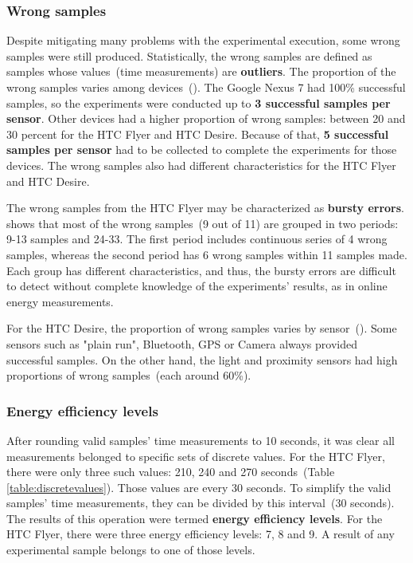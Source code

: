 \subsubsection{Wrong samples}
\hspace{10pt} Despite mitigating many problems with the experimental execution, some wrong samples were still produced. Statistically, the wrong samples are defined as samples whose values\ (time measurements) are \textbf{outliers}. The proportion of the wrong samples varies among devices\ (). The Google Nexus 7 had 100\% successful samples, so the experiments were conducted up to \textbf{3 successful samples per sensor}. Other devices had a higher proportion of wrong samples: between 20 and 30 percent for the HTC Flyer and HTC Desire. Because of that, \textbf{5 successful samples per sensor} had to be collected to complete the experiments for those devices. The wrong samples also had different characteristics for the HTC Flyer and HTC Desire. 

	
The wrong samples from the HTC Flyer may be characterized as \textbf{bursty errors}.  shows that most of the wrong samples\ (9 out of 11) are grouped in two periods: 9-13 samples and 24-33. The first period includes continuous series of 4 wrong samples, whereas the second period has 6 wrong samples within 11 samples made. Each group has different characteristics, and thus, the bursty errors are difficult to detect without complete knowledge of the experiments' results, as in online energy measurements.


For the HTC Desire, the proportion of wrong samples varies by sensor\ (). Some sensors such as "plain run", Bluetooth, GPS or Camera always provided successful samples. On the other hand, the light and proximity sensors had high proportions of wrong samples\ (each around 60\%). 



\subsubsection{Energy efficiency levels}
\label{s:implementation:levels}
\hspace{10pt} After rounding valid samples' time measurements to 10 seconds, it was clear all measurements belonged to specific sets of discrete values. For the HTC Flyer, there were only three such values: 210, 240 and 270 seconds\ (Table \ref{table:discretevalues}). Those values are every 30 seconds. To simplify the valid samples' time measurements, they can be divided by this interval\ (30 seconds). The results of this operation were termed \textbf{energy efficiency levels}. For the HTC Flyer, there were three energy efficiency levels: 7, 8 and 9. A result of any experimental sample belongs to one of those levels. 
			
